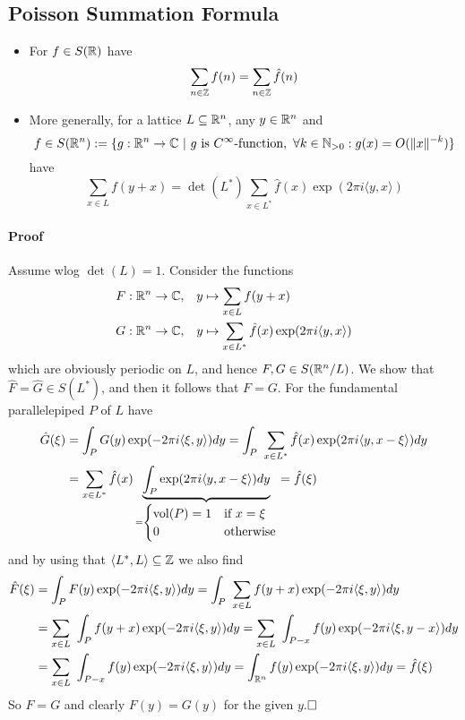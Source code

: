 \subsection{Poisson Summation Formula}
\begin{itemize}
    \item For $f \in S(\mathbb{R})$ have
    \begin{equation*}
        \sum_{n \in \mathbb{Z}} f(n) = \sum_{n \in \mathbb{Z}} \hat{f}(n)
    \end{equation*}
    \item More generally, for a lattice $L \subseteq \mathbb{R}^n$, any $y \in \mathbb{R}^n$ and 
    \begin{equation*}
        f \in S(\mathbb{R}^n) := \{ g: \mathbb{R}^n \to \mathbb{C} \ | \ \text{$g$ is $C^\infty$-function}, \ \forall k \in \mathbb{N}_{> 0}: g(x) = O(\|x\|^{-k})\}
    \end{equation*}
    have
    \begin{equation*}
        \sum_{x \in L} f(y + x) = \det(L^*) \sum_{x \in L^*} \hat{f}(x) \exp(2\pi i \langle y, x \rangle)
    \end{equation*}
\end{itemize}
\paragraph{Proof} Assume wlog $\det(L) = 1$. Consider the functions
\begin{align*}
    F: \mathbb{R}^n \to \mathbb{C}, \quad &y \mapsto \sum_{x \in L} f(y + x) \\
    G: \mathbb{R}^n \to \mathbb{C}, \quad &y \mapsto \sum_{x \in L^*} \hat{f}(x)\exp(2\pi i\langle y, x \rangle)
\end{align*}
which are obviously periodic on $L$, and hence $F, G \in S(\mathbb{R}^n / L)$.
We show that $\hat{F} = \hat{G} \in S(L^*)$, and then it follows that $F = G$. For the fundamental parallelepiped $P$ of $L$ have
\begin{align*}
    \hat{G}(\xi) &= \int_P G(y) \exp(-2\pi i \langle \xi, y \rangle) dy = \int_P \ \sum_{x \in L^*} \hat{f}(x) \exp(2\pi i \langle y, x - \xi \rangle) dy \\
    &= \sum_{x \in L^*} \hat{f}(x) \underbrace{\int_P \exp(2\pi i \langle y, x - \xi \rangle) dy}_{= \begin{cases}
        \mathrm{vol}(P) = 1 & \text{if $x = \xi$} \\
        0 & \text{otherwise}
    \end{cases}} = \hat{f}(\xi)
\end{align*}
and by using that $\langle L^*, L \rangle \subseteq \mathbb{Z}$ we also find
\begin{align*}
    \hat{F}(\xi) &= \int_P F(y) \exp(-2\pi i \langle \xi, y \rangle) dy = \int_P \ \sum_{x \in L} f(y + x) \exp(-2\pi i \langle \xi, y \rangle) dy \\
    &= \sum_{x \in L} \ \int_P f(y + x) \exp(-2\pi i \langle \xi, y \rangle) dy = \sum_{x \in L} \ \int_{P - x} f(y) \exp(-2\pi i \langle \xi, y - x \rangle) dy \\
    &= \sum_{x \in L} \ \int_{P - x} f(y) \exp(-2\pi i \langle \xi, y \rangle) dy = \int_{\mathbb{R}^n} f(y)\exp(-2\pi i \langle \xi, y \rangle) dy = \hat{f}(\xi)
\end{align*}
So $F = G$ and clearly $F(y) = G(y)$ for the given $y$.$\hfill\square$

